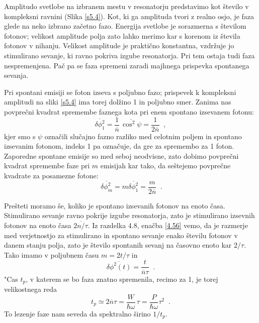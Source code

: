 Amplitudo svetlobe na izbranem mestu v resonatorju predstavimo kot število
v kompleksni ravnini (Slika \ref{s5.4}). Kot, ki ga amplituda tvori z realno
osjo, je faza glede na neko izbrano začetno fazo. Energija svetlobe je
sorazmerna s številom fotonov; velikost amplitude polja zato lahko merimo
kar s korenom iz števila fotonov v nihanju. Velikost amplitude je
praktično konstantna, vzdržuje jo stimulirano sevanje, ki ravno pokriva
izgube resonatorja. Pri tem ostaja  tudi faza nespremenjena. Pač pa se
faza spremeni zaradi majhnega prispevka spontanega sevanja.

Pri spontani emisiji se foton izseva s poljubno fazo; prispevek k kompleksni
amplitudi na sliki \ref{s5.4} ima torej dolžino 1 in poljubno smer. Zanima
nas povprečni kvadrat spremembe faznega kota pri enem spontano izsevanem
fotonu: 
\begin{equation}
\overline{\delta \phi _{1}^{2}}=\frac{1}{\overline{n}}\,\overline{\cos
^{2}\psi }=\frac{1}{2\overline{n}}\;\;,  \label{5.17}
\end{equation}
kjer smo s $\psi $ označili slučajno fazno razliko med celotnim poljem
in spontano izsevanim fotonom, indeks 1 pa označuje, da gre za spremembo
za 1 foton. Zaporedne spontane emisije so med seboj neodvisne, zato dobimo
povprečni kvadrat spremembe faze pri $m$ emisijah kar tako, da seštejemo
povprečne kvadrate za posamezne fotone: 
\begin{equation}
\ \overline{\delta \phi _{m}^{2}}=m\overline{\delta \phi _{1}^{2}}=\frac{m}{2%
\overline{n}}\;\;.  \label{5.18}
\end{equation}

Prešteti moramo še, koliko je spontano izsevanih fotonov na enoto
časa. Stimulirano sevanje ravno pokrije izgube resonatorja, zato je
stimulirano izsevnih fotonov na enoto časa $2\overline{n/}\tau $. Iz
razdelka 4.8, enačba \ref{4.56} vemo, da je razmerje med verjetnostjo za
stimulirano in spontano sevanje enako številu fotonov v danem stanju
polja, zato je število spontanih sevanj na časovno enoto kar $2/\tau $.
Tako imamo v poljubnem času $m=2t/\tau $ in 
\begin{equation}
\overline{\delta \phi ^{2}(t)}=\frac{t}{\overline{n}\tau }\;\;.  \label{5.19}
\end{equation}
"Cas $t_{p}$, v katerem se bo faza znatno spremenila, recimo za 1, je torej
velikostnega reda 
\begin{equation}
t_{p}\simeq 2\overline{n}\tau =\frac{W}{\hbar \omega }\,\tau =\frac{P}{\hbar
\omega }\tau ^{2}\;\;.  \label{5.20}
\end{equation}
To lezenje faze nam seveda da spektralno širino $1/t_{p}$.

